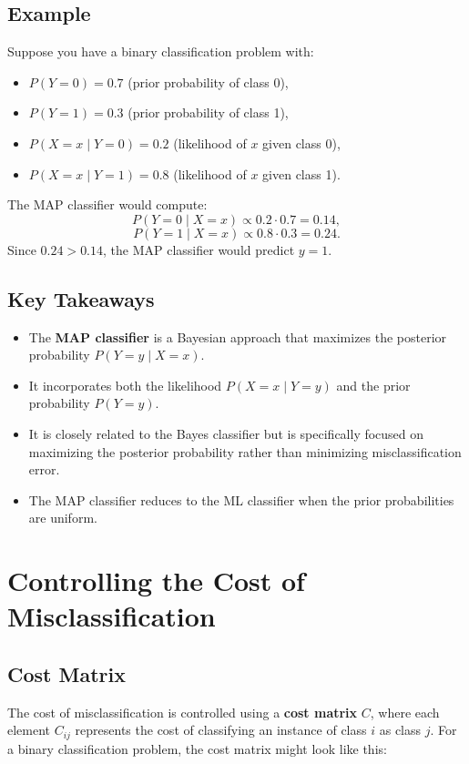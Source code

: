 \begin{notechapter}
\subsection{Example}
Suppose you have a binary classification problem with:
\begin{itemize}
    \item \( P(Y = 0) = 0.7 \) (prior probability of class 0),
    \item \( P(Y = 1) = 0.3 \) (prior probability of class 1),
    \item \( P(X = x \mid Y = 0) = 0.2 \) (likelihood of \( x \) given class 0),
    \item \( P(X = x \mid Y = 1) = 0.8 \) (likelihood of \( x \) given class 1).
\end{itemize}

The MAP classifier would compute:
\[
P(Y = 0 \mid X = x) \propto 0.2 \cdot 0.7 = 0.14,
\]
\[
P(Y = 1 \mid X = x) \propto 0.8 \cdot 0.3 = 0.24.
\]
Since \( 0.24 > 0.14 \), the MAP classifier would predict \( y = 1 \).

\subsection{Key Takeaways}
\begin{itemize}
    \item The \textbf{MAP classifier} is a Bayesian approach that maximizes the posterior probability \( P(Y = y \mid X = x) \).
    \item It incorporates both the likelihood \( P(X = x \mid Y = y) \) and the prior probability \( P(Y = y) \).
    \item It is closely related to the Bayes classifier but is specifically focused on maximizing the posterior probability rather than minimizing misclassification error.
    \item The MAP classifier reduces to the ML classifier when the prior probabilities are uniform.
\end{itemize}

\section{Controlling the Cost of Misclassification}

\subsection{Cost Matrix}
The cost of misclassification is controlled using a \textbf{cost matrix} \( C \), where each element \( C_{ij} \) represents the cost of classifying an instance of class \( i \) as class \( j \). For a binary classification problem, the cost matrix might look like this:


\end{notechapter}
